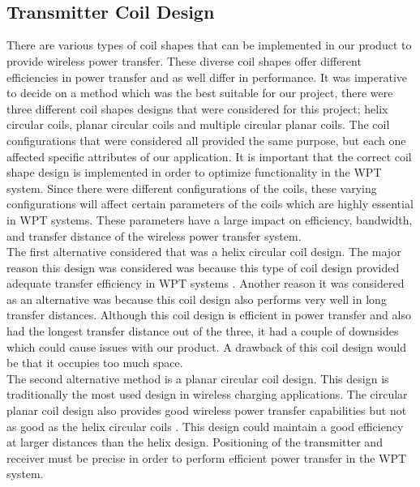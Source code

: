 \documentclass[12pt]{article}
\begin{document}
\hfill \\
\pagebreak
\hfill \\

\subsection{Transmitter Coil Design}
\indent \indent
There are various types of coil shapes that can be implemented in our product to provide wireless power transfer. These diverse coil shapes offer different efficiencies in power transfer and as well differ in performance. It was imperative to decide on a method which was the best suitable for our project, there were three different coil shapes designs that were considered for this project; helix circular coils, planar circular coils and multiple circular planar coils. The coil configurations that were considered all provided the same purpose, but each one affected specific attributes of our application.  It is important that the correct coil shape design is implemented in order to optimize functionality in the WPT system. Since there were different configurations of the coils, these varying configurations will affect certain parameters of the coils which are highly essential in WPT systems. These parameters have a large impact on efficiency, bandwidth, and transfer distance of the wireless power transfer system. \cite{mdpiCoil}\\

\indent
The first alternative considered that was a helix circular coil design. The major reason this design was considered was because this type of coil design provided adequate transfer efficiency in WPT systems \cite{rgCoilEff}. Another reason it was considered as an alternative was because this coil design also performs very well in long transfer distances. Although this coil design is efficient in power transfer and also had the longest transfer distance out of the three, it had a couple of downsides which could cause issues with our product. A drawback of this coil design would be that it occupies too much space. \cite{rgCoilEff}\\

\indent
The second alternative method is a planar circular coil design. This design is traditionally the most used design in wireless charging applications. The circular planar coil design also provides good wireless power transfer capabilities but not as good as the helix circular coils \cite{rgCoilEff}. This design could maintain a good efficiency at larger distances than the helix design. Positioning of the transmitter and receiver must be precise in order to perform efficient power transfer in the WPT system.\cite{fsinccoils}\\
\end{document}

